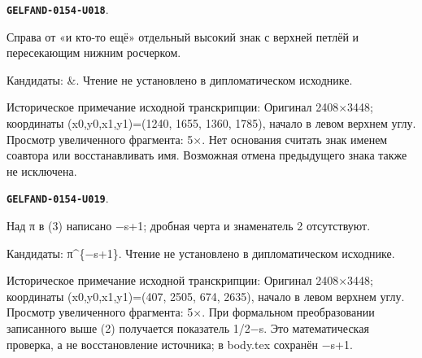 \documentclass[11pt]{article}
\theoremstyle{definition}
\theoremstyle{remark}
\begin{document}
\par\noindent\leavevmode{}\label{GELFAND-0154-U018}\label{GELFAND-P001419:witten-list-final-sign:note}\textbf{\texttt{GELFAND-0154-U018}}.\nopagebreak[4]\par
Справа от «и кто-то ещё» отдельный высокий знак с верхней петлёй и пересекающим нижним росчерком.\par
Кандидаты: \&. Чтение не установлено в дипломатическом исходнике.\par
Историческое примечание исходной транскрипции: Оригинал 2408×3448; координаты (x0,y0,x1,y1)=(1240, 1655, 1360, 1785), начало в левом верхнем углу. Просмотр увеличенного фрагмента: 5×. Нет основания считать знак именем соавтора или восстанавливать имя. Возможная отмена предыдущего знака также не исключена.\par\medskip
\par\noindent\leavevmode{}\label{GELFAND-0154-U019}\label{GELFAND-P001419:eq3-pi-exponent:note}\textbf{\texttt{GELFAND-0154-U019}}.\nopagebreak[4]\par
Над π в (3) написано −s+1; дробная черта и знаменатель 2 отсутствуют.\par
Кандидаты: π\textasciicircum{}\{−s+1\}. Чтение не установлено в дипломатическом исходнике.\par
Историческое примечание исходной транскрипции: Оригинал 2408×3448; координаты (x0,y0,x1,y1)=(407, 2505, 674, 2635), начало в левом верхнем углу. Просмотр увеличенного фрагмента: 5×. При формальном преобразовании записанного выше (2) получается показатель 1/2−s. Это математическая проверка, а не восстановление источника; в body.tex сохранён −s+1.\par\medskip
\end{document}
